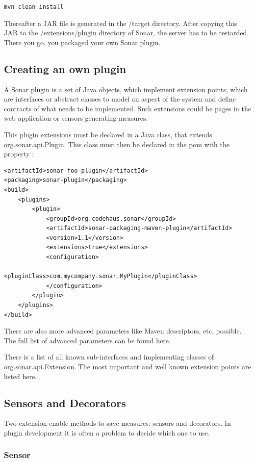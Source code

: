 \begin{verbatim}
mvn clean install
\end{verbatim}

Thereafter a JAR file is generated in the /target directory. After copying this JAR to the /extensions/plugin directory of Sonar, the server has to be restarded. There you go, you packaged your own Sonar plugin.

\subsection{Creating an own plugin}
A Sonar plugin is a set of Java objects, which implement extension points, which are interfaces or abstract classes to model an aspect of the system and define contracts of what needs to be implemented. Such extensions could be pages in the web application or sensors generating measures.

This plugin extensions must be declared in a Java class, that extends org.sonar.api.Plugin. This class must then be declared in the pom with the property :

\begin{verbatim}
<artifactId>sonar-foo-plugin</artifactId>
<packaging>sonar-plugin</packaging>
<build>
    <plugins>
        <plugin>
            <groupId>org.codehaus.sonar</groupId>
            <artifactId>sonar-packaging-maven-plugin</artifactId>
            <version>1.1</version>
            <extensions>true</extensions>
            <configuration>
                <pluginClass>com.mycompany.sonar.MyPlugin</pluginClass>
            </configuration>
        </plugin>
    </plugins>
</build>
\end{verbatim}

There are also more advanced parameters like Maven descriptors, etc. possible. The full list of advanced parameters can be found here.

There is a list of all known sub-interfaces and implementing classes of org.sonar.api.Extension. The most important and well known extension points are listed here.

\subsection{Sensors and Decorators}
Two extension enable methods to save measures: sensors and decorators. In plugin development it is often a problem to decide which one to use.

\subsubsection{Sensor}

